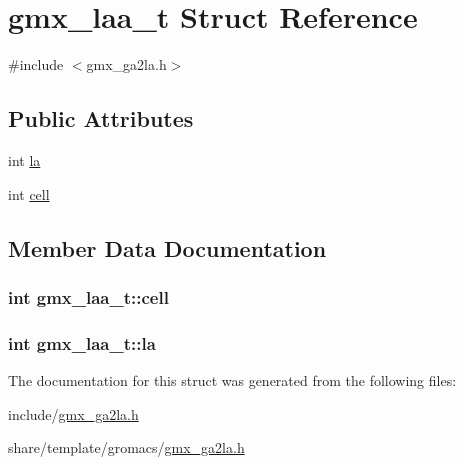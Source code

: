 \hypertarget{structgmx__laa__t}{\section{gmx\-\_\-laa\-\_\-t \-Struct \-Reference}
\label{structgmx__laa__t}
}


{\ttfamily \#include $<$gmx\-\_\-ga2la.\-h$>$}

\subsection*{\-Public \-Attributes}
\begin{DoxyCompactItemize}
\item 
int \hyperlink{structgmx__laa__t_a026594b400da23c5fd4010cedeede824}{la}
\item 
int \hyperlink{structgmx__laa__t_a68153f7c88f9afd669dd4949c94fa14b}{cell}
\end{DoxyCompactItemize}


\subsection{\-Member \-Data \-Documentation}
\hypertarget{structgmx__laa__t_a68153f7c88f9afd669dd4949c94fa14b}{
\subsubsection[{cell}]{\setlength{\rightskip}{0pt plus 5cm}int {\bf gmx\-\_\-laa\-\_\-t\-::cell}}}\label{structgmx__laa__t_a68153f7c88f9afd669dd4949c94fa14b}
\hypertarget{structgmx__laa__t_a026594b400da23c5fd4010cedeede824}{
\subsubsection[{la}]{\setlength{\rightskip}{0pt plus 5cm}int {\bf gmx\-\_\-laa\-\_\-t\-::la}}}\label{structgmx__laa__t_a026594b400da23c5fd4010cedeede824}


\-The documentation for this struct was generated from the following files\-:\begin{DoxyCompactItemize}
\item 
include/\hyperlink{include_2gmx__ga2la_8h}{gmx\-\_\-ga2la.\-h}\item 
share/template/gromacs/\hyperlink{share_2template_2gromacs_2gmx__ga2la_8h}{gmx\-\_\-ga2la.\-h}\end{DoxyCompactItemize}
